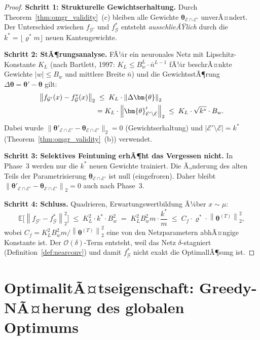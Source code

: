 ﻿\documentclass[12pt, a4paper, openany]{report}
\newcommand{\E}{\mathbb{E}}
\newcommand{\calG}{\mathcal{G}}
\newcommand{\calE}{\mathcal{E}}
\newcommand{\norms}[1]{\left\|#1\right\|}
\begin{document}
\begin{proof}
\textbf{Schritt 1: Strukturelle Gewichtserhaltung.}
Durch Theorem~\ref{thm:omgr_validity}~(c) bleiben alle Gewichte
$\bm{\theta}_{\calE \cap \calE'}$ unverÃ¤ndert.  Der Unterschied zwischen
$f_{\calG'}$ und $f^*_\calG$ entsteht \emph{ausschlieÃŸlich} durch die
$k^* = \lfloor\varrho^* m\rfloor$ neuen Kantengewichte.

\textbf{Schritt 2: StÃ¶rungsanalyse.}
FÃ¼r ein neuronales Netz mit Lipschitz-Konstante $K_L$ (nach Bartlett, 1997:
$K_L \leq B_w^L \cdot \bar{n}^{L-1}$ fÃ¼r beschrÃ¤nkte Gewichte $|w| \leq B_w$
und mittlere Breite $\bar{n}$) und die GewichtsstÃ¶rung
$\Delta\bm{\theta} = \bm{\theta}' - \bm{\theta}$ gilt:
\begin{align}
  \norms{f_{\calG'}(x) - f^*_\calG(x)}_2
  &\;\leq\; K_L \cdot \norms{\Delta\bm{\theta}}_2 \notag \\
  &= K_L \cdot \norms{\bm{\theta}'_{\calE' \setminus \calE}}_2
  \;\leq\; K_L \cdot \sqrt{k^*} \cdot B_w.
\end{align}
Dabei wurde $\|\bm{\theta}'_{\calE \cap \calE'} - \bm{\theta}_{\calE \cap \calE'}\|_2 = 0$
(Gewichtserhaltung) und $|\calE' \setminus \calE| = k^*$ (Theorem~\ref{thm:omgr_validity}~(b))
verwendet.

\textbf{Schritt 3: Selektives Feintuning erhÃ¶ht das Vergessen nicht.}
In Phase~3 werden nur die $k^*$ neuen Gewichte trainiert.  Die Ã„nderung
des alten Teils der Parametrisierung $\bm{\theta}_{\calE \cap \calE'}$
ist null (eingefroren).  Daher bleibt
$\norms{\bm{\theta}'_{\calE \cap \calE'} - \bm{\theta}_{\calE \cap \calE'}}_2 = 0$
auch nach Phase~3.

\textbf{Schritt 4: Schluss.}
Quadrieren, Erwartungswertbildung Ã¼ber $x \sim \mu$:
\[
  \E\!\bigl[\norms{f_{\calG'} - f^*_\calG}_2^2\bigr]
  \;\leq\; K_L^2 \cdot k^* \cdot B_w^2
  \;=\; K_L^2 B_w^2 m \cdot \frac{k^*}{m}
  \;\leq\; C_f \cdot \varrho^* \cdot \norms{\bm{\theta}^{(T)}}_2^2,
\]
wobei $C_f = K_L^2 B_w^2 m / \norms{\bm{\theta}^{(T)}}_2^2$ eine
von den Netzparametern abhÃ¤ngige Konstante ist.  Der $\mathcal{O}(\delta)$-Term
entsteht, weil das Netz $\delta$-stagniert
(Definition~\ref{def:nearconv}) und damit $f^*_\calG$ nicht exakt die
OptimallÃ¶sung ist.
\end{proof}

\section{OptimalitÃ¤tseigenschaft: Greedy-NÃ¤herung des globalen Optimums}
\label{sec:algo_optimality}
\end{document}
